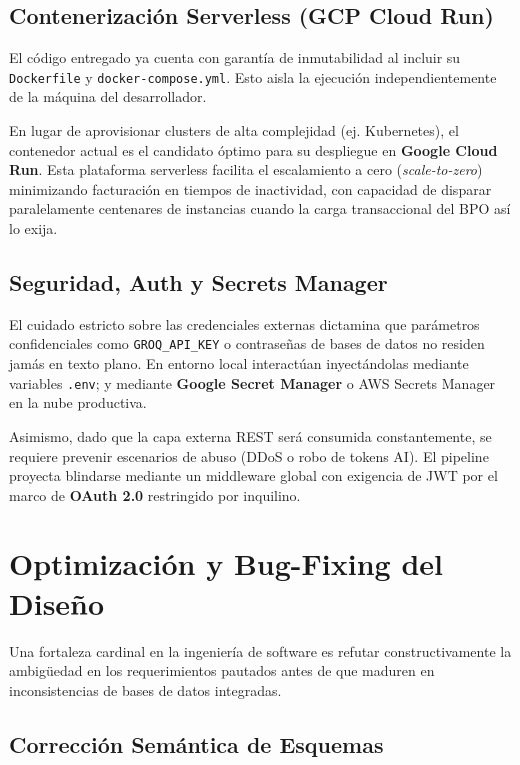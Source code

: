 \documentclass[twocolumn]{article}
\numberwithin{definition}{subsection}
\begin{document}
\subsection{Contenerización Serverless (GCP Cloud Run)}

El código entregado ya cuenta con garantía de inmutabilidad al incluir su \texttt{Dockerfile} y \texttt{docker-compose.yml}. Esto aisla la ejecución independientemente de la máquina del desarrollador.

En lugar de aprovisionar clusters de alta complejidad (ej. Kubernetes), el contenedor actual es el candidato óptimo para su despliegue en \textbf{Google Cloud Run}. Esta plataforma serverless facilita el escalamiento a cero (\textit{scale-to-zero}) minimizando facturación en tiempos de inactividad, con capacidad de disparar paralelamente centenares de instancias cuando la carga transaccional del BPO así lo exija.

\subsection{Seguridad, Auth y Secrets Manager}

El cuidado estricto sobre las credenciales externas dictamina que parámetros confidenciales como \texttt{GROQ\_API\_KEY} o contraseñas de bases de datos no residen jamás en texto plano. En entorno local interactúan inyectándolas mediante variables \texttt{.env}; y mediante \textbf{Google Secret Manager} o AWS Secrets Manager en la nube productiva.

Asimismo, dado que la capa externa REST será consumida constantemente, se requiere prevenir escenarios de abuso (DDoS o robo de tokens AI). El pipeline proyecta blindarse mediante un middleware global con exigencia de JWT por el marco de \textbf{OAuth 2.0} restringido por inquilino.

\section{Optimización y Bug-Fixing del Diseño}

Una fortaleza cardinal en la ingeniería de software es refutar constructivamente la ambigüedad en los requerimientos pautados antes de que maduren en inconsistencias de bases de datos integradas.

\subsection{Corrección Semántica de Esquemas}
\end{document}
